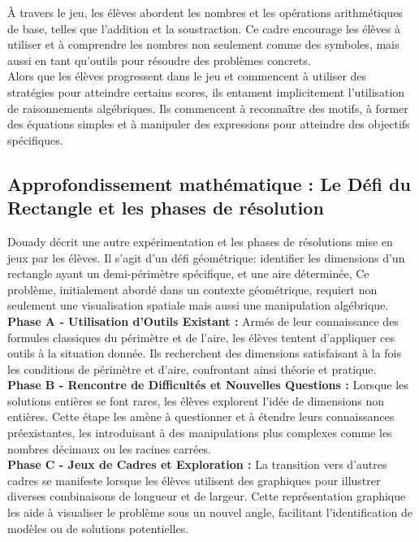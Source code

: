 À travers le jeu,
les élèves abordent les nombres et les opérations arithmétiques de base,
telles que l'addition et la soustraction.
Ce cadre encourage les élèves à utiliser et à comprendre les nombres non seulement comme des symboles,
mais aussi en tant qu'outils pour résoudre des problèmes concrets.\\

Alors que les élèves progressent dans le jeu et commencent à utiliser des stratégies pour atteindre certains scores,
ils entament implicitement l'utilisation de raisonnements algébriques.
Ils commencent à reconnaître des motifs,
à former des équations simples et à manipuler des expressions pour atteindre des objectifs spécifiques.

\subsection{Approfondissement mathématique : Le Défi du Rectangle et les phases de résolution}

Douady décrit une autre expérimentation et les phases de résolutions mise en jeux par les élèves.
Il s'agit d'un défi géométrique:
identifier les dimensions d'un rectangle ayant un demi-périmètre spécifique,
et une aire déterminée,
Ce problème,
initialement abordé dans un contexte géométrique,
requiert non seulement une visualisation spatiale mais aussi une manipulation algébrique.\\

\textbf{Phase A - Utilisation d'Outils Existant :}
Armés de leur connaissance des formules classiques du périmètre et de l'aire,
les élèves tentent d'appliquer ces outils à la situation donnée.
Ils recherchent des dimensions satisfaisant à la fois les conditions de périmètre et d'aire,
confrontant ainsi théorie et pratique.\\

\textbf{Phase B - Rencontre de Difficultés et Nouvelles Questions :}
Lorsque les solutions entières se font rares,
les élèves explorent l'idée de dimensions non entières.
Cette étape les amène à questionner et à étendre leurs connaissances préexistantes,
les introduisant à des manipulations plus complexes comme les nombres décimaux ou les racines carrées.\\

\textbf{Phase C - Jeux de Cadres et Exploration :}
La transition vers d'autres cadres se manifeste lorsque les élèves utilisent des graphiques pour illustrer diverses combinaisons de longueur et de largeur.
Cette représentation graphique les aide à visualiser le problème sous un nouvel angle,
facilitant l'identification de modèles ou de solutions potentielles.\\

